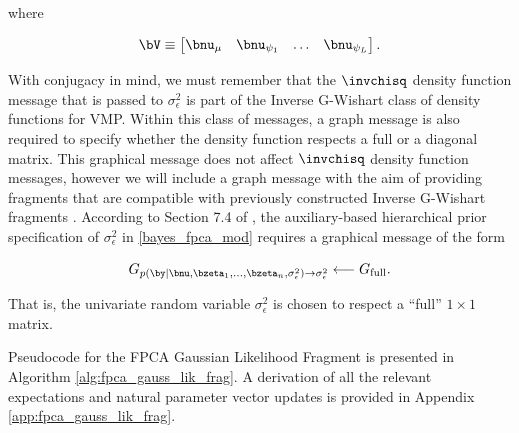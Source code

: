 \documentclass[12pt]{article}
\def\sigsqeps{\sigma^2_{\epsilon}}
\def\numu{\bnu_\mu}
\newcommand\nupsi[1]{\bnu_{\psi_{#1}}}
\theoremstyle{plain}
\theoremstyle{definition}
\theoremstyle{remark}
\begin{document}
\noindent where

\begin{equation}
	\bV \equiv \begin{bmatrix}
		\numu & \nupsi{1} & \dots & \nupsi{L}
	\end{bmatrix}.
\label{V_mat}
\end{equation}

\noindent With conjugacy in mind, we must remember that the $\invchisq$ density function message that is passed
to $\sigsqeps$ is part of the Inverse G-Wishart class of density functions for VMP. Within this class of messages,
a graph message is also required to specify whether the density function respects a full or a diagonal matrix. This
graphical message does not affect $\invchisq$ density function messages, however we will include
a graph message with the aim of providing fragments that are compatible with previously constructed Inverse
G-Wishart fragments \cite[Algorithms 1 \& 2]{maestrini20}. According to Section 7.4 of ,
the auxiliary-based hierarchical prior specification of $\sigsqeps$ in \eqref{bayes_fpca_mod} requires a
graphical message of the form

\begin{equation}
	G_{p (\by | \bnu, \bzeta_1, \dots, \bzeta_n, \sigsqeps) \rightarrow \sigsqeps}
		\longleftarrow
			G_{\text{full}}.
\label{G_lik_sigsqeps}
\end{equation}

\noindent That is, the univariate random variable $\sigsqeps$ is chosen to respect a ``full'' $1 \times 1$ matrix.

Pseudocode for the FPCA Gaussian Likelihood Fragment is presented in Algorithm \ref{alg:fpca_gauss_lik_frag}.
A derivation of all the relevant expectations and natural parameter vector updates is provided in Appendix
\ref{app:fpca_gauss_lik_frag}.
\end{document}
